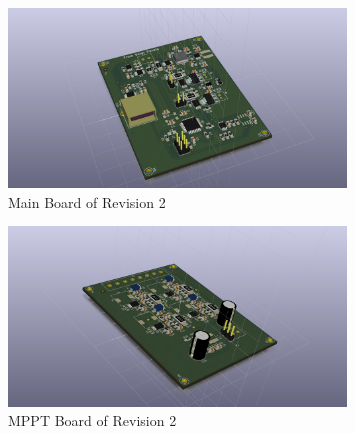\documentclass{article}
\numberwithin{figure}{section}
\numberwithin{equation}{section}
\begin{document}
{\begin{figure}[H]
	\centering
	\includegraphics[width=0.8\textwidth]{Mainboard_top}
	\caption{Main Board of Revision 2}
	\label{fig:b21}
\end{figure}

\begin{figure}[H]
	\centering
	\includegraphics[width=0.8\textwidth]{MPPTboard_top}
	\caption{MPPT Board of Revision 2}
	\label{fig:b22}
\end{figure}

}
\end{document}
